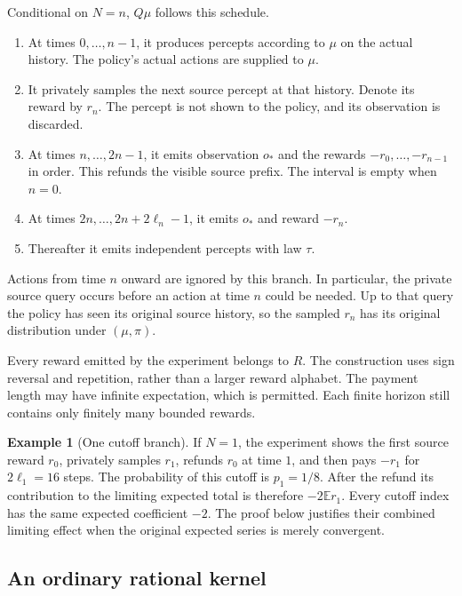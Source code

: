 \documentclass[11pt]{article}
\theoremstyle{definition}
\newtheorem{example}{Example}
\theoremstyle{remark}
\newcommand{\Exp}{\mathbb E}
\begin{document}
Conditional on $N=n$, $Q\mu$ follows this schedule.
\begin{enumerate}[label=\arabic*.,leftmargin=*]
\item At times $0,\ldots,n-1$, it produces percepts according to $\mu$
      on the actual history.  The policy's actual actions are supplied
      to $\mu$.
\item It privately samples the next source percept at that history.
      Denote its reward by $r_n$.  The percept is not shown to the
      policy, and its observation is discarded.
\item At times $n,\ldots,2n-1$, it emits observation $o_*$ and the
      rewards $-r_0,\ldots,-r_{n-1}$ in order.  This refunds the visible
      source prefix.  The interval is empty when $n=0$.
\item At times $2n,\ldots,2n+2\ell_n-1$, it emits $o_*$ and reward
      $-r_n$.
\item Thereafter it emits independent percepts with law $\tau$.
\end{enumerate}
Actions from time $n$ onward are ignored by this branch.  In particular,
the private source query occurs before an action at time $n$ could be
needed.  Up to that query the policy has seen its original source
history, so the sampled $r_n$ has its original distribution under
$(\mu,\pi)$.

Every reward emitted by the experiment belongs to $R$.  The construction
uses sign reversal and repetition, rather than a larger reward alphabet.
The payment length may have infinite expectation, which is permitted.
Each finite horizon still contains only finitely many bounded rewards.

\begin{example}[One cutoff branch]
If $N=1$, the experiment shows the first source reward $r_0$, privately
samples $r_1$, refunds $r_0$ at time $1$, and then pays $-r_1$ for
$2\ell_1=16$ steps.  The probability of this cutoff is $p_1=1/8$.
After the refund its contribution to the limiting expected total is
therefore $-2\Exp r_1$.  Every cutoff index has the same expected
coefficient $-2$.  The proof below justifies their combined limiting
effect when the original expected series is merely convergent.
\end{example}

\subsection{An ordinary rational kernel}
\end{document}

